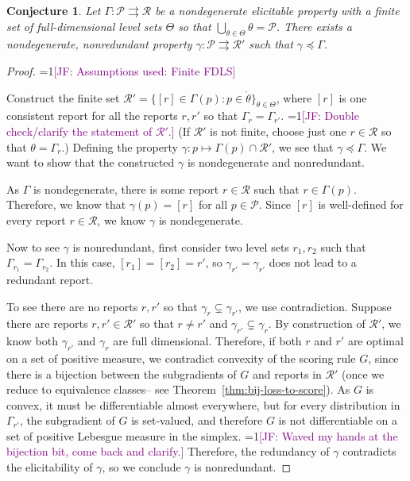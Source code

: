 \documentclass[12pt]{article}
\newcommand{\Comments}{1}
\newcommand{\mynote}[2]{\ifnum\Comments=1\textcolor{#1}{#2}\fi}
\newcommand{\jessie}[1]{\mynote{purple}{[JF: #1]}}
\renewcommand{\P}{\mathcal{P}}
\newcommand{\R}{\mathcal{R}}
\newcommand{\inter}[1]{\mathring{#1}}%
\newcommand{\toto}{\rightrightarrows}
\newtheorem{conjecture}{Conjecture}
\begin{document}
\begin{conjecture}\label{conj:gam-prime-exists}
	Let $\Gamma:\P \toto \R$ be a nondegenerate elicitable property with a finite set of full-dimensional level sets $\Theta$ so that $\bigcup_{\theta \in \Theta}\theta = \P$.
	There exists a nondegenerate, nonredundant property $\gamma: \P \toto \R'$ such that $\gamma \preceq \Gamma$. 
\end{conjecture}
\begin{proof}
\jessie{Assumptions used: Finite FDLS}

	
	Construct the finite set $\R' = \{[r] \in \Gamma(p) : p \in \inter{\theta} \}_{\theta \in \Theta}$, where $[r]$ is one consistent report for all the reports $r, r'$ so that $\Gamma_r = \Gamma_{r'}$. 
	\jessie{Double check/clarify the statement of $\R'$.}
	(If $\R'$ is not finite, choose just one $r \in \R$ so that $\theta = \Gamma_r$.)
	Defining the property $\gamma : p \mapsto \Gamma(p) \cap \R'$, we see that $\gamma \preceq \Gamma$.
	We want to show that the constructed $\gamma$ is nondegenerate and nonredundant.

	As $\Gamma$ is nondegenerate, there is some report $r \in \R$ such that $r \in \Gamma(p)$.
	Therefore, we know that $\gamma(p) = [r]$ for all $p\in \P$.
	Since $[r]$ is well-defined for every report $r \in \R$, we know $\gamma$ is nondegenerate.

	Now to see $\gamma$ is nonredundant, first consider two level sets $r_1, r_2$ such that $\Gamma_{r_1} = \Gamma_{r_2}$.
	In this case, $[r_1] = [r_2] = r'$, so $\gamma_{r'} = \gamma_{r'}$ does not lead to a redundant report.
	
	To see there are no reports $r, r'$ so that $\gamma_{r} \subsetneq \gamma_{r'}$, we use contradiction.
	Suppose there are reports $r, r' \in \R'$ so that $r \neq r'$ and $\gamma_{r'} \subsetneq \gamma_{r}$.
	By construction of $\R'$, we know both $\gamma_{r'}$ and $\gamma_r$ are full dimensional.
	Therefore, if both $r$ and $r'$ are optimal on a set of positive measure, we contradict convexity of the scoring rule $G$, since there is a bijection between the subgradients of $G$ and reports in $\R'$ (once we reduce to equivalence classes-- see Theorem~\ref{thm:bij-loss-to-score}).
	As $G$ is convex, it must be differentiable almost everywhere, but for every distribution in $\Gamma_{r'}$, the subgradient of $G$ is set-valued, and therefore $G$ is not differentiable on a set of positive Lebesgue measure in the simplex. \jessie{Waved my hands at the bijection bit, come back and clarify.}
	Therefore, the redundancy of $\gamma$ contradicts the elicitability of $\gamma$, so we conclude $\gamma$ is nonredundant. 


\end{proof}
\end{document}
